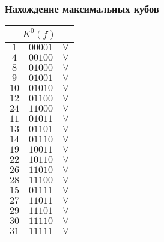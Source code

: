 \documentclass[12pt,a4paper]{report}
\begin{document}
\subsubsection*{Нахождение максимальных кубов} 
\begin{tabular}{|ccc|}
    \hline
    \multicolumn{3}{|c|}{$K^0(f)$}\\
    \hline
    $1$ & $00001$ & $\vee$\\
    $4$ & $00100$ & $\vee$\\
    $8$ & $01000$ & $\vee$\\
    \hline
    $9$ & $01001$ & $\vee$\\
    $10$ & $01010$ & $\vee$\\
    $12$ & $01100$ & $\vee$\\
    $24$ & $11000$ & $\vee$\\
    \hline
    $11$ & $01011$ & $\vee$\\
    $13$ & $01101$ & $\vee$\\
    $14$ & $01110$ & $\vee$\\
    $19$ & $10011$ & $\vee$\\
    $22$ & $10110$ & $\vee$\\
    $26$ & $11010$ & $\vee$\\
    $28$ & $11100$ & $\vee$\\
    \hline
    $15$ & $01111$ & $\vee$\\
    $27$ & $11011$ & $\vee$\\
    $29$ & $11101$ & $\vee$\\
    $30$ & $11110$ & $\vee$\\
    \hline
    $31$ & $11111$ & $\vee$\\
    \hline
\end{tabular}
\end{document}

